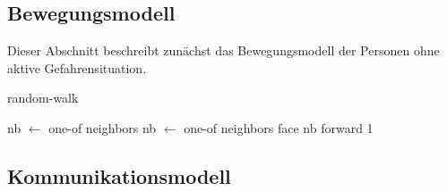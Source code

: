 \subsection{Bewegungsmodell}
\label{sec:bewegungsmodell}

Dieser Abschnitt beschreibt zunächst das Bewegungsmodell der Personen ohne aktive Gefahrensituation.

\begin{algorithm}
\caption{random-walk}
\begin{algorithmic} 
\STATE nb $\leftarrow$ one-of neighbors
\STATE nb $\leftarrow$ one-of neighbors 
\ENDWHILE
\STATE face nb
\STATE forward 1
\end{algorithmic}
\end{algorithm}


\subsection{Kommunikationsmodell}
\label{sec:kommunikationsmodell}

